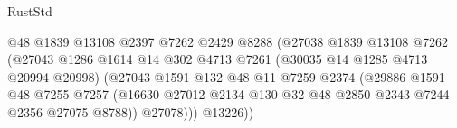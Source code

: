 \begin{lexlean}{RustStd}
\begin{coremodule}
                                              @48
                                              @1839
                                              @13108
                                              @2397
                                              @7262
                                              @2429
                                              @8288
                                              (@27038
                                                @1839
                                                @13108
                                                @7262
                                                (@27043
                                                  @1286
                                                  @1614
                                                  @14
                                                  @302
                                                  @4713
                                                  @7261
                                                  (@30035 @14 @1285 @4713 @20994 @20998)
                                                  (@27043
                                                    @1591
                                                    @132
                                                    @48
                                                    @11
                                                    @7259
                                                    @2374
                                                    (@29886
                                                      @1591
                                                      @48
                                                      @7255
                                                      @7257
                                                      (@16630
                                                        @27012
                                                        @2134
                                                        @130
                                                        @32
                                                        @48
                                                        @2850
                                                        @2343
                                                        @7244
                                                        @2356
                                                        @27075
                                                        @8788))
                                                    @27078)))
                                              @13226))

\end{coremodule}
\end{lexlean}
